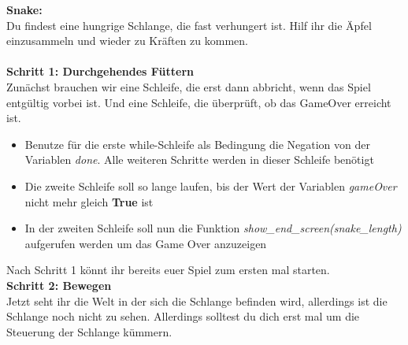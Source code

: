\textbf{\large Snake:}\\
Du findest eine hungrige Schlange, die fast verhungert ist. Hilf ihr die Äpfel einzusammeln und wieder zu Kräften zu kommen.\\\\
\textbf{Schritt 1: Durchgehendes Füttern}\\
Zunächst brauchen wir eine Schleife, die erst dann abbricht, wenn das Spiel entgültig vorbei ist. Und eine Schleife, die überprüft, ob das GameOver erreicht ist.
\begin{itemize}
	\item Benutze für die erste while-Schleife als Bedingung die Negation von der Variablen \textit{done}. Alle weiteren Schritte werden in dieser Schleife benötigt
	\item Die zweite Schleife soll so lange laufen, bis der Wert der Variablen \textit{gameOver} nicht mehr gleich \textbf{True} ist
	\item In der zweiten Schleife soll nun die Funktion \textit{show\_end\_screen(snake\_length)} aufgerufen werden um das Game Over anzuzeigen
\end{itemize}
Nach Schritt 1 könnt ihr bereits euer Spiel zum ersten mal starten.\\
\textbf{Schritt 2: Bewegen}\\
Jetzt seht ihr die Welt in der sich die Schlange befinden wird, allerdings ist die Schlange noch nicht zu sehen. Allerdings solltest du dich erst mal um die Steuerung der Schlange kümmern.

